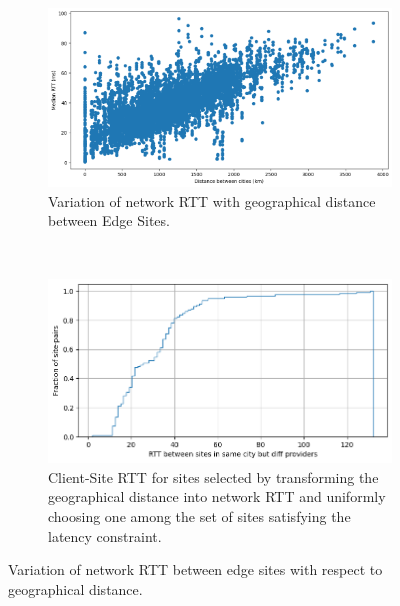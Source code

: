 \begin{figure}[t!]
    \centering
    \begin{subfigure}[t]{0.45\textwidth}
        \centering
        \includegraphics[width=\textwidth]{figures/mechanisms/nw_proximity/shortest-rtt-vs-dist.png}
        \caption{Variation of network RTT with geographical distance between Edge Sites.}
        \label{fig:geodist_vs_rtt}
    \end{subfigure}%
    ~ 
    \begin{subfigure}[t]{0.45\textwidth}
        \centering
        \includegraphics[width=\textwidth]{figures/mechanisms/nw_proximity/same_city_diff_provider_rtts.png}
        \caption{Client-Site RTT for sites selected by transforming the geographical distance into network RTT and uniformly choosing one among the set of sites satisfying the latency constraint.}
        \label{fig:same_city_diff_prov}
    \end{subfigure}
    \caption{Variation of network RTT between edge sites with respect to geographical distance. }
\end{figure}

